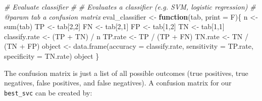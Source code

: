 \documentclass[
]{book}
\newenvironment{Shaded}{\begin{snugshade}}{\end{snugshade}}
\newcommand{\AttributeTok}[1]{\textcolor[rgb]{0.77,0.63,0.00}{#1}}
\newcommand{\CommentTok}[1]{\textcolor[rgb]{0.56,0.35,0.01}{\textit{#1}}}
\newcommand{\ControlFlowTok}[1]{\textcolor[rgb]{0.13,0.29,0.53}{\textbf{#1}}}
\newcommand{\DecValTok}[1]{\textcolor[rgb]{0.00,0.00,0.81}{#1}}
\newcommand{\FunctionTok}[1]{\textcolor[rgb]{0.00,0.00,0.00}{#1}}
\newcommand{\NormalTok}[1]{#1}
\newcommand{\OtherTok}[1]{\textcolor[rgb]{0.56,0.35,0.01}{#1}}
\newcommand{\SpecialCharTok}[1]{\textcolor[rgb]{0.00,0.00,0.00}{#1}}
\begin{document}
\begin{Shaded}
\begin{Highlighting}[]
\CommentTok{\#\textquotesingle{} Evaluate classifier}
\CommentTok{\#\textquotesingle{}}
\CommentTok{\#\textquotesingle{} Evaluates a classifier (e.g. SVM, logistic regression)}
\CommentTok{\#\textquotesingle{} @param tab a confusion matrix}
\NormalTok{eval\_classifier }\OtherTok{\textless{}{-}} \ControlFlowTok{function}\NormalTok{(tab, }\AttributeTok{print =}\NormalTok{ F)\{}
\NormalTok{  n }\OtherTok{\textless{}{-}} \FunctionTok{sum}\NormalTok{(tab)}
\NormalTok{  TP }\OtherTok{\textless{}{-}}\NormalTok{ tab[}\DecValTok{2}\NormalTok{,}\DecValTok{2}\NormalTok{]}
\NormalTok{  FN }\OtherTok{\textless{}{-}}\NormalTok{ tab[}\DecValTok{2}\NormalTok{,}\DecValTok{1}\NormalTok{]}
\NormalTok{  FP }\OtherTok{\textless{}{-}}\NormalTok{ tab[}\DecValTok{1}\NormalTok{,}\DecValTok{2}\NormalTok{]}
\NormalTok{  TN }\OtherTok{\textless{}{-}}\NormalTok{ tab[}\DecValTok{1}\NormalTok{,}\DecValTok{1}\NormalTok{]}
\NormalTok{  classify.rate }\OtherTok{\textless{}{-}}\NormalTok{ (TP }\SpecialCharTok{+}\NormalTok{ TN) }\SpecialCharTok{/}\NormalTok{ n}
\NormalTok{  TP.rate }\OtherTok{\textless{}{-}}\NormalTok{ TP }\SpecialCharTok{/}\NormalTok{ (TP }\SpecialCharTok{+}\NormalTok{ FN)}
\NormalTok{  TN.rate }\OtherTok{\textless{}{-}}\NormalTok{ TN }\SpecialCharTok{/}\NormalTok{ (TN }\SpecialCharTok{+}\NormalTok{ FP)}
\NormalTok{  object }\OtherTok{\textless{}{-}} \FunctionTok{data.frame}\NormalTok{(}\AttributeTok{accuracy =}\NormalTok{ classify.rate,}
                       \AttributeTok{sensitivity =}\NormalTok{ TP.rate,}
                       \AttributeTok{specificity =}\NormalTok{ TN.rate)}
\NormalTok{  object}
\NormalTok{\}}
\end{Highlighting}
\end{Shaded}

The confusion matrix is just a list of all possible outcomes (true positives, true negatives, false positives, and false negatives). A confusion matrix for our \texttt{best\_svc} can be created by:

\begin{Shaded}
\end{Shaded}
\end{document}
